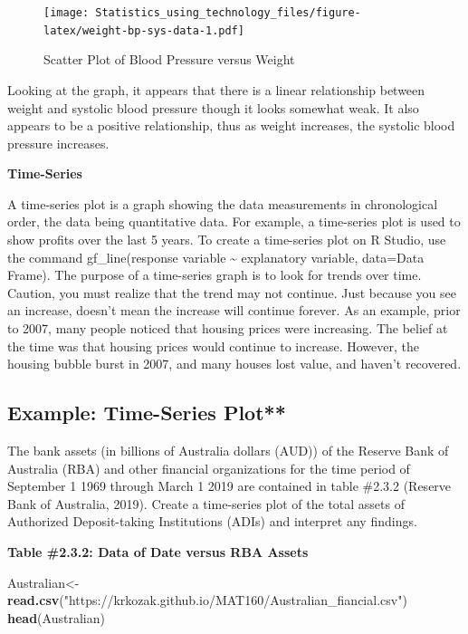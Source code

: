 \documentclass[]{book}
\newenvironment{Shaded}{\begin{snugshade}}{\end{snugshade}}
\newcommand{\KeywordTok}[1]{\textcolor[rgb]{0.13,0.29,0.53}{\textbf{#1}}}
\newcommand{\NormalTok}[1]{#1}
\newcommand{\StringTok}[1]{\textcolor[rgb]{0.31,0.60,0.02}{#1}}
\begin{document}
\begin{figure}
\centering
\texttt{[image: Statistics\_using\_technology\_files/figure-latex/weight-bp-sys-data-1.pdf]}
\caption{\label{fig:weight-bp-sys-data}Scatter Plot of Blood Pressure versus Weight}
\end{figure}

Looking at the graph, it appears that there is a linear relationship between weight and systolic blood pressure though it looks somewhat weak. It also appears to be a positive relationship, thus as weight increases, the systolic blood pressure increases.

\textbf{Time-Series }

A time-series plot is a graph showing the data measurements in chronological order, the data being quantitative data. For example, a time-series plot is used to show profits over the last 5 years. To
create a time-series plot on R Studio, use the command gf\_line(response variable \textasciitilde{} explanatory variable, data=Data Frame). The purpose of a time-series graph is to look for trends over time. Caution, you must realize that the trend may not continue. Just because you see an increase, doesn't mean the increase will continue forever. As an example, prior to 2007, many people noticed that housing prices were increasing. The belief at the time was that housing prices would continue to increase. However, the housing bubble burst in 2007, and many houses lost value, and haven't
recovered.

\hypertarget{example-time-series-plot}{%
\subsection{Example: Time-Series Plot**}\label{example-time-series-plot}}

The bank assets (in billions of Australia dollars (AUD)) of the Reserve Bank of Australia (RBA) and other financial organizations for the time period of September 1 1969 through March 1 2019 are contained in table \#2.3.2 (Reserve Bank of Australia, 2019). Create a time-series plot of the total assets of Authorized Deposit-taking Institutions (ADIs) and interpret any findings.

\textbf{Table \#2.3.2: Data of Date versus RBA Assets}

\begin{Shaded}
\begin{Highlighting}[]
\NormalTok{Australian<-}\StringTok{ }\KeywordTok{read.csv}\NormalTok{(}\StringTok{"https://krkozak.github.io/MAT160/Australian_fiancial.csv"}\NormalTok{)}
\KeywordTok{head}\NormalTok{(Australian)}
\end{Highlighting}
\end{Shaded}
\end{document}
